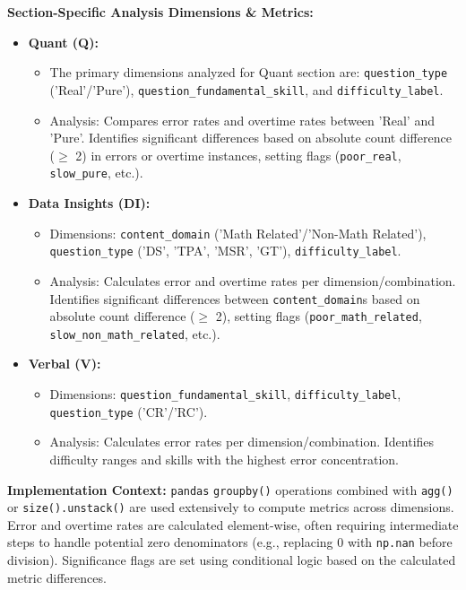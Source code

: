 \documentclass{article}
\begin{document}
\textbf{Section-Specific Analysis Dimensions \& Metrics:}
\begin{itemize}
    \item \textbf{Quant (Q):}
    \begin{itemize}
        \item The primary dimensions analyzed for Quant section are: \texttt{question\_type} ('Real'/'Pure'), \texttt{question\_fundamental\_skill}, and \texttt{difficulty\_label}.
        \item Analysis: Compares error rates and overtime rates between 'Real' and 'Pure'. Identifies significant differences based on absolute count difference ($\geq$ 2) in errors or overtime instances, setting flags (\texttt{poor\_real}, \texttt{slow\_pure}, etc.). %
    \end{itemize}
    \item \textbf{Data Insights (DI):}
    \begin{itemize}
        \item Dimensions: \texttt{content\_domain} ('Math Related'/'Non-Math Related'), \texttt{question\_type} ('DS', 'TPA', 'MSR', 'GT'), \texttt{difficulty\_label}.
        \item Analysis: Calculates error and overtime rates per dimension/combination. Identifies significant differences between \texttt{content\_domain}s based on absolute count difference ($\geq$ 2), setting flags (\texttt{poor\_math\_related}, \texttt{slow\_non\_math\_related}, etc.). %
    \end{itemize}
    \item \textbf{Verbal (V):}
    \begin{itemize}
        \item Dimensions: \texttt{question\_fundamental\_skill}, \texttt{difficulty\_label}, \texttt{question\_type} ('CR'/'RC').
        \item Analysis: Calculates error rates per dimension/combination. Identifies difficulty ranges and skills with the highest error concentration.
    \end{itemize}
\end{itemize}

\textbf{Implementation Context:} \texttt{pandas} \texttt{groupby()} operations combined with \texttt{agg()} or \texttt{size().unstack()} are used extensively to compute metrics across dimensions. Error and overtime rates are calculated element-wise, often requiring intermediate steps to handle potential zero denominators (e.g., replacing 0 with \texttt{np.nan} before division). Significance flags are set using conditional logic based on the calculated metric differences.
\end{document}
